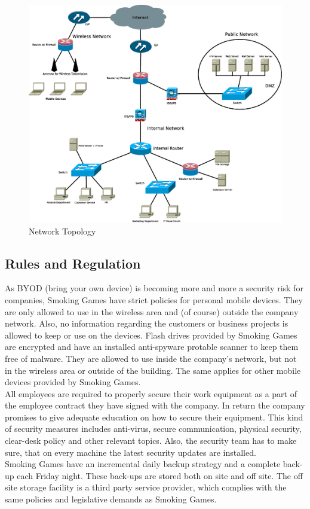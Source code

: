 \begin{figure}[htpb]\centering
	\includegraphics[width=\textwidth]{pictures/network_topology.eps}
	\caption{Network Topology}
	\label{fig:net_top}
\end{figure}
\newpage
\subsection{Rules and Regulation}
As BYOD (bring your own device) is becoming more and more a security risk for companies, Smoking Games have strict policies for personal mobile devices. They are only allowed to use in the wireless area and (of course) outside the company network. Also, no information regarding the customers or business projects is allowed to keep or use on the devices. Flash drives provided by Smoking Games are encrypted and have an installed anti-spyware protable scanner to keep them free of malware. They are allowed to use inside the company's network, but not in the wireless area or outside of the building. The same applies for other mobile devices provided by Smoking Games.\\
All employees are required to properly secure their work equipment as a part of the employee contract they have signed with the company. In return the company promises to give adequate education on how to secure their equipment. This kind of security measures includes anti-virus,
secure communication, physical security, clear-desk policy and other relevant topics. Also, the security team has to make sure, that on every machine the latest security updates are installed.\\
Smoking Games have an incremental daily backup strategy and a complete back-up each Friday night. These back-ups are stored both on site and off site. The off site storage facility is a third party service provider, which complies with the same policies and legislative demands as Smoking Games.\\